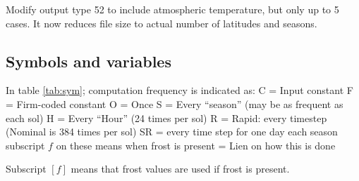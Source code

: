 \documentclass{article}
\begin{document}
Modify output type 52 to include atmospheric temperature, but only up to 5
cases. It now reduces file size to actual number of latitudes and seasons.



\subsection{Symbols and  variables}
In table \ref{tab:sym}; computation frequency is indicated as:
\qii C = Input constant
\qii F = Firm-coded constant
\qii O = Once
\qii S = Every ``season'' (may be as frequent as each sol)
\qii H = Every ``Hour'' (24 times per sol)
\qii R = Rapid: every timestep (Nominal is 384 times per sol)
\qiii SR = every time step for one day each season
\qi subscript $f$ on these means when frost is present
\qii * = Lien on how this is done

Subscript $[f]$ means that frost values are used if frost is present.
\end{document}
